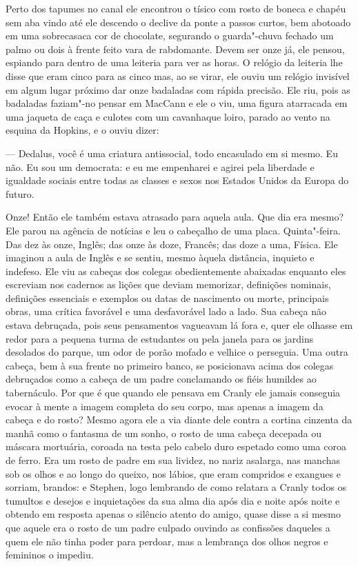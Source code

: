 Perto dos tapumes no canal ele encontrou o tísico com rosto de boneca e
chapéu sem aba vindo até ele descendo o declive da ponte a passos
curtos, bem abotoado em uma sobrecasaca cor de chocolate, segurando o
guarda"-chuva fechado um palmo ou dois à frente feito vara de
rabdomante. Devem ser onze já, ele pensou, espiando para dentro de uma
leiteria para ver as horas. O relógio da leiteria lhe disse que eram
cinco para as cinco mas, ao se virar, ele ouviu um relógio invisível em
algum lugar próximo dar onze badaladas com rápida precisão. Ele riu,
pois as badaladas faziam"-no pensar em MacCann e ele o viu, uma figura
atarracada em uma jaqueta de caça e culotes com um cavanhaque loiro,
parado ao vento na esquina da Hopkins, e o ouviu dizer:

 --- Dedalus, você é uma criatura antissocial, todo encasulado em si mesmo.
Eu não. Eu sou um democrata: e eu me empenharei e agirei pela liberdade
e igualdade sociais entre todas as classes e sexos nos Estados Unidos
da Europa do futuro.

Onze! Então ele também estava atrasado para aquela aula. Que dia era
mesmo? Ele parou na agência de notícias e leu o cabeçalho de uma placa.
Quinta"-feira. Das dez às onze, Inglês; das onze às doze, Francês; das
doze a uma, Física. Ele imaginou a aula de Inglês e se sentiu, mesmo
àquela distância, inquieto e indefeso. Ele viu as cabeças dos colegas
obedientemente abaixadas enquanto eles escreviam nos cadernos as lições
que deviam memorizar, definições nominais, definições essenciais e
exemplos ou datas de nascimento ou morte, principais obras, uma crítica
favorável e uma desfavorável lado a lado. Sua cabeça não estava
debruçada, pois seus pensamentos vagueavam lá fora e, quer ele olhasse
em redor para a pequena turma de estudantes ou pela janela para os
jardins desolados do parque, um odor de porão mofado e velhice o
perseguia. Uma outra cabeça, bem à sua frente no primeiro banco,
se posicionava acima dos colegas debruçados como a cabeça de um padre
conclamando os fiéis humildes ao tabernáculo. Por que é que quando ele
pensava em Cranly ele jamais conseguia evocar à mente a imagem completa
do seu corpo, mas apenas a imagem da cabeça e do rosto? Mesmo agora ele
a via diante dele contra a cortina cinzenta da manhã como o fantasma de
um sonho, o rosto de uma cabeça decepada ou máscara mortuária, coroada
na testa pelo cabelo duro espetado como uma coroa de ferro. Era um
rosto de padre em sua lividez, no nariz asalarga, nas manchas sob os 
olhos e ao longo do queixo, nos lábios, que eram compridos e exangues e
sorriam, brandos: e Stephen, logo lembrando de como relatara a Cranly
todos os tumultos e desejos e inquietações da sua alma dia após dia e
noite após noite e obtendo em resposta apenas o silêncio atento do
amigo, quase disse a si mesmo que aquele era o rosto de um padre
culpado ouvindo as confissões daqueles a quem ele não tinha poder para
perdoar, mas a lembrança dos olhos negros e femininos o impediu.

